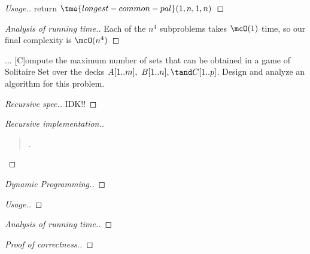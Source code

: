 \documentclass{article}
\begin{document}
\begin{proof}[Usage.]
  return \( \tmo{longest-common-pal}(1,n,1,n) \)
\end{proof}

\begin{proof}[Analysis of running time.]
  Each of the \( n^4 \) subproblems takes \( \mcO(1) \) time, so our final complexity is \( \mcO(n^4) \)
\end{proof}
\pagebreak

\setcounter{exercise}{9}
\begin{exercise}
  ... [C]ompute the maximum number of sets that can be obtained
  in a game of Solitaire Set over the decks \( A[1..m],\ B[1..n],\tand C[1..p] \). Design and analyze an algorithm for this problem.
\end{exercise}

\begin{proof}[Recursive spec.]
IDK!!
\end{proof}

\begin{proof}[Recursive implementation.]\
\begin{quote}
\begin{steps}
  \item .
\end{steps}
\end{quote}
\end{proof}

\begin{proof}[Dynamic Programming.]

\end{proof}

\begin{proof}[Usage.]

\end{proof}

\begin{proof}[Analysis of running time.]

\end{proof}

\begin{proof}[Proof of correctness.]

\end{proof}
\end{document}
